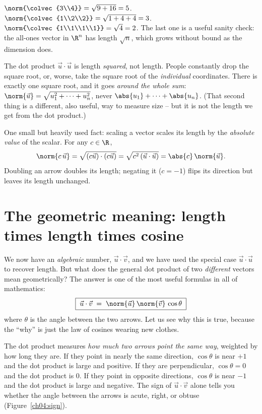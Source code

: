 \begin{example}
$\norm{\colvec{3\\4}} = \sqrt{9+16} = 5$. \quad
$\norm{\colvec{1\\2\\2}} = \sqrt{1+4+4} = 3$. \quad
$\norm{\colvec{1\\1\\1\\1}} = \sqrt{4} = 2$.
The last one is a useful sanity check: the all-ones vector in $\R^n$ has length
$\sqrt n$, which grows without bound as the dimension does.
\end{example}

\begin{trapbox}
The dot product $\vec u\cdot\vec u$ is length \emph{squared}, not length. People
constantly drop the square root, or, worse, take the square root of the
\emph{individual} coordinates. There is exactly one square root, and it goes
\emph{around the whole sum}: $\norm{\vec u}=\sqrt{u_1^2+\cdots+u_n^2}$, never
$\abs{u_1}+\cdots+\abs{u_n}$. (That second thing is a different, also useful, way
to measure size -- but it is not the length we get from the dot product.)
\end{trapbox}

One small but heavily used fact: scaling a vector scales its length by the
\emph{absolute value} of the scalar. For any $c\in\R$,
\[
  \norm{c\,\vec u} = \sqrt{(c\vec u)\cdot(c\vec u)}
                   = \sqrt{c^2\,(\vec u\cdot\vec u)}
                   = \abs{c}\,\norm{\vec u}.
\]
Doubling an arrow doubles its length; negating it ($c=-1$) flips its direction but
leaves its length unchanged.

\section{The geometric meaning: length times length times cosine}

We now have an \emph{algebraic} number, $\vec u\cdot\vec v$, and we have used the
special case $\vec u\cdot\vec u$ to recover length. But what does the general dot
product of two \emph{different} vectors mean geometrically? The answer is one of
the most useful formulas in all of mathematics:
\[
  \boxed{\;\vec u\cdot\vec v \;=\; \norm{\vec u}\,\norm{\vec v}\,\cos\theta\;}
\]
where $\theta$ is the angle between the two arrows. Let us see why this is true,
because the ``why'' is just the law of cosines wearing new clothes.

\begin{intuitionbox}
The dot product measures \emph{how much two arrows point the same way}, weighted by
how long they are. If they point in nearly the same direction, $\cos\theta$ is near
$+1$ and the dot product is large and positive. If they are perpendicular,
$\cos\theta = 0$ and the dot product is $0$. If they point in opposite directions,
$\cos\theta$ is near $-1$ and the dot product is large and negative. The sign of
$\vec u\cdot\vec v$ alone tells you whether the angle between the arrows is acute,
right, or obtuse (Figure~\ref{ch04:sign}).
\end{intuitionbox}

